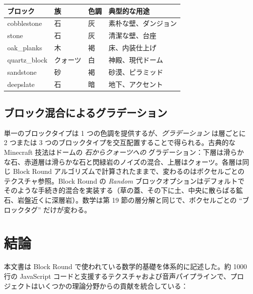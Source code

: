 \documentclass[12pt,a4paper]{scrartcl}
\begin{document}
\vspace{0.4em}
\begin{center}
\begin{tabular}{@{}llll@{}}
\toprule
\textbf{ブロック} & \textbf{族} & \textbf{色調} & \textbf{典型的な用途} \\
\midrule
cobblestone        & 石  & 灰  & 素朴な壁、ダンジョン \\
stone              & 石  & 灰  & 清潔な壁、台座 \\
oak\_planks        & 木   & 褐   & 床、内装仕上げ \\
quartz\_block      & クォーツ    & 白   & 神殿、現代ドーム \\
sandstone          & 砂   & 褐   & 砂漠、ピラミッド \\
deepslate          & 石  & 暗  & 地下、アクセント \\
\bottomrule
\end{tabular}
\end{center}

\subsection{ブロック混合によるグラデーション}
単一のブロックタイプは 1 つの色調を提供するが、\emph{グラデーション} は層ごとに 2 つまたは 3 つのブロックタイプを交互配置することで得られる。古典的な Minecraft 技法はドームの \emph{石からクォーツへの} グラデーション：下層は滑らかな石、赤道層は滑らかな石と閃緑岩のノイズの混合、上層はクォーツ。各層は同じ Block Round アルゴリズムで計算されたままで、変わるのはボクセルごとのテクスチャ参照。Block Round の \emph{Random} ブロックオプションはデフォルトでそのような手続き的混合を実装する（草の蓋、その下に土、中央に散らばる鉱石、岩盤近くに深層岩）。数学は第 19 節の層分解と同じで、ボクセルごとの \enquote{ブロックタグ} だけが変わる。

\section{結論}

本文書は Block Round で使われている数学的基礎を体系的に記述した。約 1000 行の JavaScript コードと支援するテクスチャおよび音声パイプラインで、プロジェクトはいくつかの理論分野からの貢献を統合している：
\end{document}
